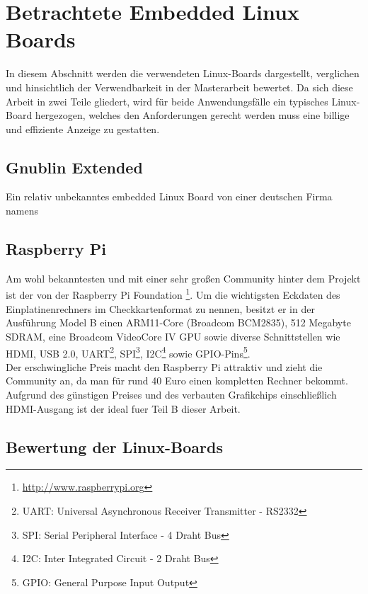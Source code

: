 \section{Betrachtete Embedded Linux Boards}
\label{cha:betrachtete_linux_boards}
In diesem Abschnitt werden die verwendeten Linux-Boards dargestellt, verglichen und hinsichtlich der Verwendbarkeit in der Masterarbeit bewertet. Da sich diese Arbeit in zwei Teile gliedert, wird für beide Anwendungsfälle ein typisches Linux-Board hergezogen, welches den Anforderungen gerecht werden muss eine billige und effiziente Anzeige zu gestatten.
\subsection{Gnublin Extended}
\label{cha:gnublin_extended}
Ein relativ unbekanntes embedded Linux Board von einer deutschen Firma namens  

\subsection{Raspberry Pi}
\label{cha:raspberry}
Am wohl bekanntesten und mit einer sehr großen Community hinter dem Projekt ist der  von der Raspberry Pi Foundation \footnote{\url{http://www.raspberrypi.org}}. Um die wichtigsten Eckdaten des Einplatinenrechners im Checkkartenformat zu nennen, besitzt er in der Ausführung Model B einen ARM11-Core (Broadcom BCM2835), 512 Megabyte SDRAM, eine Broadcom VideoCore IV GPU sowie diverse Schnittstellen wie HDMI, USB 2.0, UART\footnote{UART: Universal Asynchronous Receiver Transmitter - RS2332}, SPI\footnote{SPI: Serial Peripheral Interface - 4 Draht Bus}, I2C\footnote{I2C: Inter Integrated Circuit - 2 Draht Bus} sowie GPIO-Pins\footnote{GPIO: General Purpose Input Output}.\\
Der erschwingliche Preis macht den Raspberry Pi attraktiv und zieht die Community an, da man für rund 40 Euro einen kompletten Rechner bekommt. \\
Aufgrund des günstigen Preises und des verbauten Grafikchips einschließlich HDMI-Ausgang ist der  ideal fuer Teil B dieser Arbeit.


\subsection{Bewertung der Linux-Boards}
\label{cha:bewertung_linux_boards}